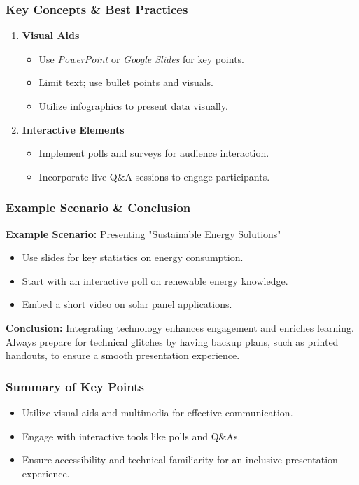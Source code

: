 \documentclass[aspectratio=169]{beamer}
\begin{document}
\begin{frame}[fragile]
    \frametitle{Key Concepts \& Best Practices}
    \begin{enumerate}
        \item \textbf{Visual Aids}
            \begin{itemize}
                \item Use \textit{PowerPoint} or \textit{Google Slides} for key points.
                \item Limit text; use bullet points and visuals.
                \item Utilize infographics to present data visually.
            \end{itemize}
        \item \textbf{Interactive Elements}
            \begin{itemize}
                \item Implement polls and surveys for audience interaction.
                \item Incorporate live Q\&A sessions to engage participants.
            \end{itemize}
    \end{enumerate}
\end{frame}

\begin{frame}[fragile]
    \frametitle{Example Scenario \& Conclusion}
    \textbf{Example Scenario:} Presenting "Sustainable Energy Solutions"
    \begin{itemize}
        \item Use slides for key statistics on energy consumption.
        \item Start with an interactive poll on renewable energy knowledge.
        \item Embed a short video on solar panel applications.
    \end{itemize}
    \textbf{Conclusion:} 
    Integrating technology enhances engagement and enriches learning. Always prepare for technical glitches by having backup plans, such as printed handouts, to ensure a smooth presentation experience.
\end{frame}

\begin{frame}[fragile]
    \frametitle{Summary of Key Points}
    \begin{itemize}
        \item Utilize visual aids and multimedia for effective communication.
        \item Engage with interactive tools like polls and Q\&As.
        \item Ensure accessibility and technical familiarity for an inclusive presentation experience.
    \end{itemize}
\end{frame}
\end{document}
